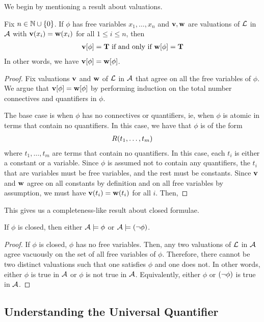 We begin by mentioning a result about valuations.

\begin{boxtheorem}
    Fix $n \in \mathbb{N} \cup \left\{ 0 \right\}$. If $\phi$ has free variables $x_1, \ldots, x_n$ and $\mathbf{v}, \mathbf{w}$ are valuations of $\mathcal{L}$ in $\mathcal{A}$ with $\mathbf{v}\!\left( x_i \right) = \mathbf{w}\!\left( x_i \right)$ for all $1 \leq i \leq n$, then
    \begin{align*}
        \mathbf{v}\!\left[ \phi \right] = \mathbf{T} \text{ if and only if } \mathbf{w}\!\left[ \phi \right] = \mathbf{T}
    \end{align*}
    In other words, we have $\mathbf{v}\!\left[ \phi \right] = \mathbf{w}\!\left[ \phi \right]$.
\end{boxtheorem}
\begin{proof}
    Fix valuations $\mathbf{v}$ and $\mathbf{w}$ of $\mathcal{L}$ in $\mathcal{A}$ that agree on all the free variables of $\phi$. We argue that $\mathbf{v}\!\left[ \phi \right] = \mathbf{w}\!\left[ \phi \right]$ by performing induction on the total number connectives and quantifiers in $\phi$.

    The base case is when $\phi$ has no connectives or quantifiers, ie, when $\phi$ is atomic in terms that contain no quantifiers. In this case, we have that $\phi$ is of the form
    \begin{align*}
        R\!\left( t_1, \ldots, t_m \right)
    \end{align*}
    where $t_1, \ldots, t_m$ are terms that contain no quantifiers. In this case, each $t_i$ is either a constant or a variable. Since $\phi$ is assumed not to contain any quantifiers, the $t_i$ that are variables must be free variables, and the rest must be constants. Since $\mathbf{v}$ and $\mathbf{w}$ agree on all constants by definition and on all free variables by assumption, we must have
    $\mathbf{v}\!\left( t_i \right) = \mathbf{w}\!\left( t_i \right)$ for all $i$. Then, \sorry
\end{proof}

This gives us a completeness-like result about closed formulae.

\begin{boxcorollary}
    If $\phi$ is closed, then either $\mathcal{A} \models \phi$ or $\mathcal{A} \models \left( \neg \phi \right)$.
\end{boxcorollary}
\begin{proof}
    If $\phi$ is closed, $\phi$ has no free variables. Then, any two valuations of $\mathcal{L}$ in $\mathcal{A}$ agree vacuously on the set of all free variables of $\phi$. Therefore, there cannot be two distinct valuations such that one satisfies $\phi$ and one does not. In other words, either $\phi$ is true in $\mathcal{A}$ or $\phi$ is not true in $\mathcal{A}$. Equivalently, either $\phi$ or $\left( \neg \phi \right)$ is true in $\mathcal{A}$.
\end{proof}


\subsection{Understanding the Universal Quantifier}

